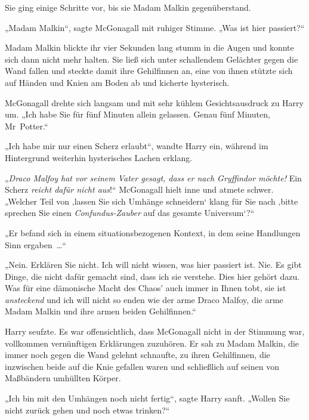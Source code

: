 Sie ging einige Schritte vor, bis sie Madam Malkin gegenüberstand.

„Madam Malkin“, sagte McGonagall mit ruhiger Stimme. „Was ist hier passiert?“

Madam Malkin blickte ihr vier Sekunden lang stumm in die Augen und konnte sich dann nicht mehr halten. Sie ließ sich unter schallendem Gelächter gegen die Wand fallen und steckte damit ihre Gehilfinnen an, eine von ihnen stützte sich auf Händen und Knien am Boden ab und kicherte hysterisch.

McGonagall drehte sich langsam und mit sehr kühlem Gesichtsausdruck zu Harry um. „Ich habe Sie für fünf Minuten allein gelassen. Genau fünf Minuten, Mr~Potter.“

„Ich habe mir nur einen Scherz erlaubt“, wandte Harry ein, während im Hintergrund weiterhin hysterisches Lachen erklang.

„\emph{Draco Malfoy hat vor seinem Vater gesagt, dass er nach Gryffindor möchte!} Ein Scherz \emph{reicht dafür nicht aus}!“ McGonagall hielt inne und atmete schwer. „Welcher Teil von ‚lassen Sie sich Umhänge schneidern‘ klang für Sie nach ‚bitte sprechen Sie einen \emph{Confundus-Zauber} auf das gesamte Universum‘?“

„Er befand sich in einem situationsbezogenen Kontext, in dem seine Handlungen Sinn ergaben …“

„Nein. Erklären Sie nicht. Ich will nicht wissen, was hier passiert ist. Nie. Es gibt Dinge, die nicht dafür gemacht sind, dass ich sie verstehe. Dies hier gehört dazu. Was für eine dämonische Macht des Chaos' auch immer in Ihnen tobt, sie ist \emph{ansteckend} und ich will nicht so enden wie der arme Draco Malfoy, die arme Madam Malkin und ihre armen beiden Gehilfinnen.“

Harry seufzte. Es war offensichtlich, dass McGonagall nicht in der Stimmung war, vollkommen vernünftigen Erklärungen zuzuhören. Er sah zu Madam Malkin, die immer noch gegen die Wand gelehnt schnaufte, zu ihren Gehilfinnen, die inzwischen beide auf die Knie gefallen waren und schließlich auf seinen von Maßbändern umhüllten Körper.

„Ich bin mit den Umhängen noch nicht fertig“, sagte Harry sanft. „Wollen Sie nicht zurück gehen und noch etwas trinken?“
